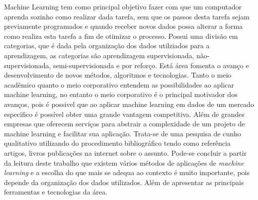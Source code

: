 \noindent
Machine Learning tem como principal objetivo fazer com 
que um computador aprenda sozinho como realizar dada tarefa, sem que os passos desta tarefa sejam previamente programados e
quando receber novos dados possa alterar a forma como realiza esta tarefa a fim de otimizar o processo. Possui uma divisão
em categorias, que é dada pela organização dos dados utilziados para a aprendizagem, as categorias são aprendizagem supervisionada, não-supervisionada, 
semi-supervisionada e por reforço.
\noindent
Está área fomenta o avanço e desenvolvimento de novos métodos, algoritmos e tecnologias. Tanto o meio acadêmico quanto o meio 
corporativo entendem as possibilidades ao aplicar machine learning, no entanto o meio corporativo é o principal motivador 
dos avanços, pois é possivel que ao aplicar machine learning em dados de um mercado especifico é possível obter uma grande
vantagem competitiva. Além de grandes empresas que oferecem serviços para abstrair a complexidade de um projeto de 
machine learning e facilitar sua aplicação.
\noindent
Trata-se de uma pesquisa de cunho qualitativo utilizando do procedimento
bibliográfico tendo como referência artigos, livros publicações na internet sobre o assunto. Pode-se concluir a partir da 
leitura deste trabalho que existem vários métodos de aplicações de \textit{machine learning} e a escolha do que mais 
se adequa ao contexto é muito importante, pois depende da organização dos dados utilizados. 
Além de apresentar as principais ferramentas e tecnologias da área.   


\newpage